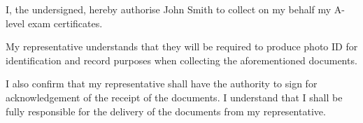 \documentclass[stdletternofrom]{newlfm}
\begin{document}
  \begin{newlfm}
    I, the undersigned, hereby authorise John Smith to collect on my behalf my
    A-level exam certificates.

    My representative understands that they will be required to produce photo
    ID for identification and record purposes when collecting the
    aforementioned documents.

    I also confirm that my representative shall have the authority to sign for
    acknowledgement of the receipt of the documents. I understand that I
    shall be fully responsible for the delivery of the documents from my
    representative.
  \end{newlfm}
\end{document}
